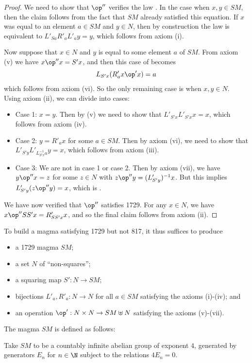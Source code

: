 \begin{proof}  We need to show that $\op''$ verifies the law .  In the case when $x,y \in SM$, then the claim follows from the fact that $SM$ already satisfied this equation.  If $x$ was equal to an element $a \in SM$ and $y \in N$, then by construction the law is equivalent to $L'_{Sa} R'_a L'_a y = y$, which follows from axiom (i).

Now suppose that $x \in N$ and $y$ is equal to some element $a$ of $SM$.  From axiom (v) we have $x \op'' x = S'x$, and then this case of  becomes
$$L_{S'x} ( R'_a x \op' x ) = a$$
which follows from axiom (vi).  So the only remaining case is when $x,y \in N$.  Using axiom (ii), we can divide into cases:
\begin{itemize}
\item Case 1: $x=y$.  Then by (v) we need to show that $L'_{S'x} L'_{S'x} x = x$, which follows from axiom (iv).
\item Case 2: $y = R'_a x$ for some $a \in SM$.  Then by axiom (vi), we need to show that $L'_{S'y} L'_{L_{S'x}^{-1} a} y = x$, which follows from axiom (iii).
\item Case 3: We are not in case 1 or case 2.  Then by axiom (vii), we have $y \op'' x = z$ for some $z \in N$ with $z \op'' y = (L'_{S'y})^{-1} x$.  But this implies $L'_{S'y} (z \op'' y) = x$, which is .
\end{itemize}

We have now verified that $\op''$ satisfies 1729.  For any $x \in N$, we have $x \op'' SS' x = R'_{SS' x} x$, and so the final claim follows from axiom (ii).
\end{proof}

To build a magma satisfying 1729 but not 817, it thus suffices to produce
\begin{itemize}
  \item a 1729 magma $SM$;
  \item a set $N$ of ``non-squares'';
  \item a squaring map $S': N \to SM$;
  \item bijections $L'_a, R'_a: N \to N$ for all $a \in SM$ satisfying the axioms (i)-(iv); and
  \item an operation $\op': N \times N \to SM \uplus N$ satisfying the axioms (v)-(vii).
\end{itemize}

The magma $SM$ is defined as follows:

\begin{definition}[Definition of $SM$]\label{sm-def}\leanok Take $SM$ to be a countably infinite abelian group of exponent $4$, generated by generators $E_n$ for $n \in \N$ subject to the relations $4E_n=0$.
\end{definition}

